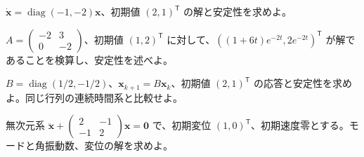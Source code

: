 \documentclass[11pt]{article}
\begin{document}

\problem[対角系の時間応答]
$\dot{\boldsymbol x}=\operatorname{diag}(-1,-2)\boldsymbol x$、初期値 $(2,1)^{\mathsf T}$ の解と安定性を求めよ。
\workspace{38mm}

\problem[対角化できない減衰系]
$A=\begin{pmatrix}-2&3\\0&-2\end{pmatrix}$、初期値 $(1,2)^{\mathsf T}$ に対して、$((1+6t)e^{-2t},2e^{-2t})^{\mathsf T}$ が解であることを検算し、安定性を述べよ。
\workspace{38mm}
\newpage

\problem[離散時間]
$B=\operatorname{diag}(1/2,-1/2)$、$\boldsymbol x_{k+1}=B\boldsymbol x_k$、初期値 $(2,1)^{\mathsf T}$ の応答と安定性を求めよ。同じ行列の連続時間系と比較せよ。
\workspace{38mm}

\problem[結合振動]
無次元系 $\ddot{\boldsymbol x}+\begin{pmatrix}2&-1\\-1&2\end{pmatrix}\boldsymbol x=\boldsymbol0$ で、初期変位 $(1,0)^{\mathsf T}$、初期速度零とする。モードと角振動数、変位の解を求めよ。
\workspace{38mm}
\end{document}
